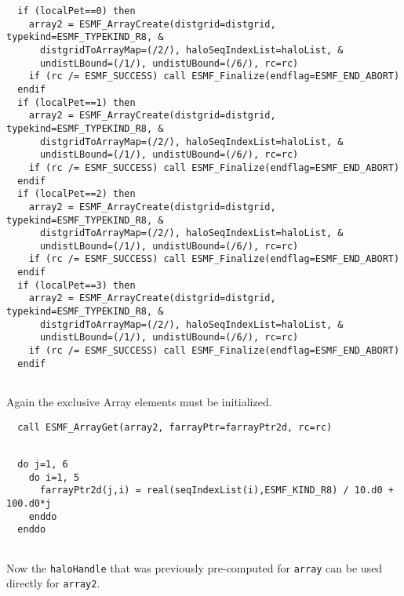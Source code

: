  \begin{verbatim}
  if (localPet==0) then
    array2 = ESMF_ArrayCreate(distgrid=distgrid, typekind=ESMF_TYPEKIND_R8, &
      distgridToArrayMap=(/2/), haloSeqIndexList=haloList, &
      undistLBound=(/1/), undistUBound=(/6/), rc=rc)
    if (rc /= ESMF_SUCCESS) call ESMF_Finalize(endflag=ESMF_END_ABORT)
  endif
  if (localPet==1) then
    array2 = ESMF_ArrayCreate(distgrid=distgrid, typekind=ESMF_TYPEKIND_R8, &
      distgridToArrayMap=(/2/), haloSeqIndexList=haloList, &
      undistLBound=(/1/), undistUBound=(/6/), rc=rc)
    if (rc /= ESMF_SUCCESS) call ESMF_Finalize(endflag=ESMF_END_ABORT)
  endif
  if (localPet==2) then
    array2 = ESMF_ArrayCreate(distgrid=distgrid, typekind=ESMF_TYPEKIND_R8, &
      distgridToArrayMap=(/2/), haloSeqIndexList=haloList, &
      undistLBound=(/1/), undistUBound=(/6/), rc=rc)
    if (rc /= ESMF_SUCCESS) call ESMF_Finalize(endflag=ESMF_END_ABORT)
  endif
  if (localPet==3) then
    array2 = ESMF_ArrayCreate(distgrid=distgrid, typekind=ESMF_TYPEKIND_R8, &
      distgridToArrayMap=(/2/), haloSeqIndexList=haloList, &
      undistLBound=(/1/), undistUBound=(/6/), rc=rc)
    if (rc /= ESMF_SUCCESS) call ESMF_Finalize(endflag=ESMF_END_ABORT)
  endif
 
\end{verbatim}
 

   Again the exclusive Array elements must be initialized. 

 \begin{verbatim}
  call ESMF_ArrayGet(array2, farrayPtr=farrayPtr2d, rc=rc)
 
\end{verbatim}
 

 \begin{verbatim}
  do j=1, 6
    do i=1, 5
      farrayPtr2d(j,i) = real(seqIndexList(i),ESMF_KIND_R8) / 10.d0 + 100.d0*j
    enddo
  enddo
 
\end{verbatim}
 

   Now the {\tt haloHandle} that was previously pre-computed for {\tt array} can
   be used directly for {\tt array2}. 

